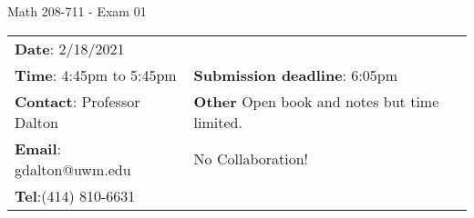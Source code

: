 \documentclass[12pt,letterpaper]{article}
\author{Gary Dalton <gdalton@uwm.edu>}
\begin{document}
	
\begin{center} \LARGE Math 208-711 - Exam 01\end{center}%
\smallskip

\begin{center} \begin{tabular}{l l}
		\textbf{Date}: 2/18/2021 \\
		\textbf{Time}: 4:45pm to 5:45pm &
		\textbf{Submission deadline}: 6:05pm\\
		\textbf{Contact}: Professor Dalton
		& \textbf{Other} Open book and notes but time limited. \\
		\textbf{Email}: gdalton@uwm.edu 
		& \qquad No Collaboration! \\
		\textbf{Tel}:(414) 810-6631
\end{tabular} \end{center}%
\end{document}
